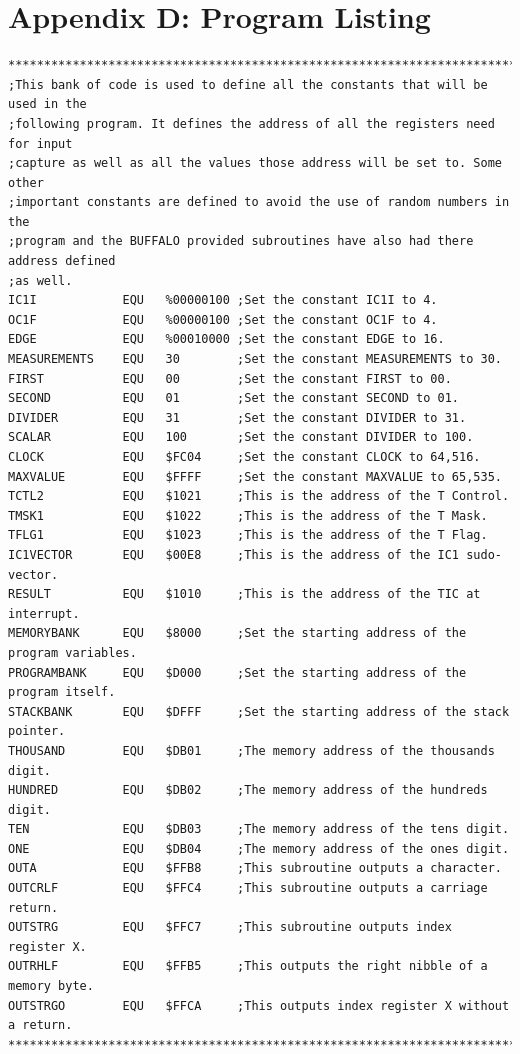 \documentclass[12pt]{report}
\begin{document}
\section*{Appendix D: Program Listing}
	\begin{Verbatim}[frame=single, fontsize=\footnotesize]
****************************************************************************************
;This bank of code is used to define all the constants that will be used in the
;following program. It defines the address of all the registers need for input
;capture as well as all the values those address will be set to. Some other
;important constants are defined to avoid the use of random numbers in the
;program and the BUFFALO provided subroutines have also had there address defined
;as well.
IC1I            EQU   %00000100 ;Set the constant IC1I to 4.
OC1F            EQU   %00000100 ;Set the constant OC1F to 4.
EDGE            EQU   %00010000 ;Set the constant EDGE to 16.
MEASUREMENTS    EQU   30        ;Set the constant MEASUREMENTS to 30.
FIRST           EQU   00        ;Set the constant FIRST to 00.
SECOND          EQU   01        ;Set the constant SECOND to 01.
DIVIDER         EQU   31        ;Set the constant DIVIDER to 31.
SCALAR          EQU   100       ;Set the constant DIVIDER to 100.
CLOCK           EQU   $FC04     ;Set the constant CLOCK to 64,516.
MAXVALUE        EQU   $FFFF     ;Set the constant MAXVALUE to 65,535.
TCTL2           EQU   $1021     ;This is the address of the T Control.
TMSK1           EQU   $1022     ;This is the address of the T Mask.
TFLG1           EQU   $1023     ;This is the address of the T Flag.
IC1VECTOR       EQU   $00E8     ;This is the address of the IC1 sudo-vector.
RESULT          EQU   $1010     ;This is the address of the TIC at interrupt.
MEMORYBANK      EQU   $8000     ;Set the starting address of the program variables.
PROGRAMBANK     EQU   $D000     ;Set the starting address of the program itself.
STACKBANK       EQU   $DFFF     ;Set the starting address of the stack pointer.
THOUSAND        EQU   $DB01     ;The memory address of the thousands digit.
HUNDRED         EQU   $DB02     ;The memory address of the hundreds digit.
TEN             EQU   $DB03     ;The memory address of the tens digit.
ONE             EQU   $DB04     ;The memory address of the ones digit.
OUTA            EQU   $FFB8     ;This subroutine outputs a character.
OUTCRLF         EQU   $FFC4     ;This subroutine outputs a carriage return.
OUTSTRG         EQU   $FFC7     ;This subroutine outputs index register X.
OUTRHLF         EQU   $FFB5     ;This outputs the right nibble of a memory byte.
OUTSTRGO        EQU   $FFCA     ;This outputs index register X without a return.
****************************************************************************************


\end{Verbatim}
\end{document}
